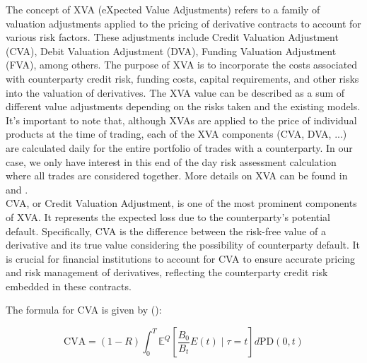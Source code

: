 \documentclass{article}
\begin{document}
The concept of XVA (eXpected Value Adjustments) refers to a family of valuation adjustments applied to the pricing of derivative contracts to account for various risk factors. These adjustments include Credit Valuation Adjustment (CVA), Debit Valuation Adjustment (DVA), Funding Valuation Adjustment (FVA), among others. The purpose of XVA is to incorporate the costs associated with counterparty credit risk, funding costs, capital requirements, and other risks into the valuation of derivatives. The XVA value can be described as a sum of different value adjustments depending on the risks taken and the existing models.
It's important to note that, although XVAs are applied to the price of individual products at the time of trading, each of the XVA components (CVA, DVA, ...) are calculated daily for the entire portfolio of trades with a counterparty. In our case, we only have interest in this end of the day risk assessment calculation where all trades are considered together. More details on XVA can be found in \cite{burgard2017derivatives} and \cite{xva2015andrewgreen}. \\

CVA, or Credit Valuation Adjustment, is one of the most prominent components of XVA. It represents the expected loss due to the counterparty's potential default. Specifically, CVA is the difference between the risk-free value of a derivative and its true value considering the possibility of counterparty default. It is crucial for financial institutions to account for CVA to ensure accurate pricing and risk management of derivatives, reflecting the counterparty credit risk embedded in these contracts.

The formula for CVA is given by (\cite{xva2015andrewgreen}):

$$
\text{CVA} = (1 - R) \int_0^T \mathbb{E}^Q\left[\frac{B_0}{B_t}E(t) \mid \tau = t\right] d\text{PD}(0, t)
$$
\end{document}
